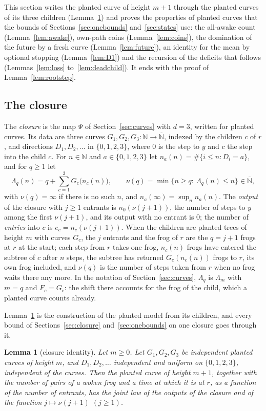 \documentclass[11pt]{amsart}
\newtheorem{lemma}[theorem]{Lemma}
\theoremstyle{definition}
\numberwithin{equation}{section}
\newcommand{\lean}[1]{\ignorespaces}
\newcommand{\N}{\mathbb{N}}
\newcommand{\Nb}{\overline{\mathbb{N}}}
\begin{document}
This section writes the planted curve of height $m+1$ through the planted curves of its three children (Lemma~\ref{lem:closid}) and proves the properties of planted curves that the bounds of Sections~\ref{sec:onebounds} and~\ref{sec:states} use: the all-awake count (Lemma~\ref{lem:awake}), own-path coins (Lemma~\ref{lem:coins}), the domination of the future by a fresh curve (Lemma~\ref{lem:future}), an identity for the mean by optional stopping (Lemma~\ref{lem:D1}) and the recursion of the deficits that follows (Lemmas~\ref{lem:loss} to~\ref{lem:deadchild}). It ends with the proof of Lemma~\ref{lem:rootstep}.

\subsection*{The closure}
The \emph{closure} is the map $\Psi$ of Section~\ref{sec:curves} with $d=3$, written for planted curves. Its data are three curves $G_1,G_2,G_3:\N\to\Nb$, indexed by the children $c$ of $r$, and directions $D_1,D_2,\dots$ in $\{0,1,2,3\}$, where $0$ is the step to $y$ and $c$ the step into the child $c$. For $n\in\N$ and $a\in\{0,1,2,3\}$ let $n_a(n)=\#\{i\le n:D_i=a\}$, and for $q\ge1$ let
\[
\Lambda_q(n)=q+\sum_{c=1}^3G_c\bigl(n_c(n)\bigr),\qquad\nu(q)=\min\{n\ge q:\ \Lambda_q(n)\le n\}\in\Nb,
\]
with $\nu(q)=\infty$ if there is no such $n$, and $n_a(\infty)=\sup_nn_a(n)$. The \emph{output} of the closure with $j\ge1$ entrants is $n_0(\nu(j+1))$, the number of steps to $y$ among the first $\nu(j+1)$, and its output with no entrant is $0$; the number of \emph{entries} into $c$ is $e_c=n_c(\nu(j+1))$. When the children are planted trees of height $m$ with curves $G_c$, the $j$ entrants and the frog of $r$ are the $q=j+1$ frogs at $r$ at the start; each step from $r$ takes one frog, $n_c(n)$ frogs have entered the subtree of $c$ after $n$ steps, the subtree has returned $G_c(n_c(n))$ frogs to $r$, its own frog included, and $\nu(q)$ is the number of steps taken from $r$ when no frog waits there any more. In the notation of Section~\ref{sec:curves}, $\Lambda_q$ is $\Lambda_m$ with $m=q$ and $F_c=G_c$: the shift there accounts for the frog of the child, which a planted curve counts already.

Lemma~\ref{lem:closid} is the construction of the planted model from its children, and every bound of Sections~\ref{sec:closure} and~\ref{sec:onebounds} on one closure goes through it.

\begin{lemma}[closure identity]\label{lem:closid}\lean{FrogModel.D3.LaneA.Pool.curveLaw_succ_proof, FrogModel.D3.LaneA.measurable_plantedPair_proof, FrogModel.D3.LaneA.measurable_closPair_proof, FrogModel.D3.Iface.curveLaw_succ, FrogModel.D3.Iface.closMeasure, FrogModel.D3.Iface.closCurve}
Let $m\ge0$. Let $G_1,G_2,G_3$ be independent planted curves of height $m$, and $D_1,D_2,\dots$ independent and uniform on $\{0,1,2,3\}$, independent of the curves. Then the planted curve of height $m+1$, together with the number of pairs of a woken frog and a time at which it is at $r$, as a function of the number of entrants, has the joint law of the outputs of the closure and of the function $j\mapsto\nu(j+1)$ $(j\ge1)$.
\end{lemma}
\end{document}
